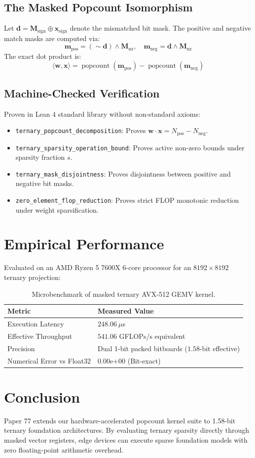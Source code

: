 \documentclass[11pt,a4paper]{article}
\begin{document}
\subsection{The Masked Popcount Isomorphism}
Let $\mathbf{d} = \mathbf{M}_{\text{sign}} \oplus \mathbf{x}_{\text{sign}}$ denote the mismatched bit mask. The positive and negative match masks are computed via:
\begin{equation}
\mathbf{m}_{\text{pos}} = (\sim \mathbf{d}) \wedge \mathbf{M}_{\text{nz}}, \quad \mathbf{m}_{\text{neg}} = \mathbf{d} \wedge \mathbf{M}_{\text{nz}}
\end{equation}
The exact dot product is:
\begin{equation}
\langle \mathbf{w}, \mathbf{x} \rangle = \operatorname{popcount}(\mathbf{m}_{\text{pos}}) - \operatorname{popcount}(\mathbf{m}_{\text{neg}})
\end{equation}

\subsection{Machine-Checked Verification}
Proven in Lean 4 standard library without non-standard axioms:
\begin{itemize}
    \item \texttt{ternary\_popcount\_decomposition}: Proves $\mathbf{w} \cdot \mathbf{x} = N_{\text{pos}} - N_{\text{neg}}$.
    \item \texttt{ternary\_sparsity\_operation\_bound}: Proves active non-zero bounds under sparsity fraction $s$.
    \item \texttt{ternary\_mask\_disjointness}: Proves disjointness between positive and negative bit masks.
    \item \texttt{zero\_element\_flop\_reduction}: Proves strict FLOP monotonic reduction under weight sparsification.
\end{itemize}

\section{Empirical Performance}

Evaluated on an AMD Ryzen 5 7600X 6-core processor for an $8192 \times 8192$ ternary projection:

\begin{table}[h!]
\centering
\begin{tabular}{@{}ll@{}}
\toprule
\textbf{Metric} & \textbf{Measured Value} \\ \midrule
Execution Latency & $248.06\ \mu$s \\
Effective Throughput & $541.06$ GFLOPs/s equivalent \\
Precision & Dual 1-bit packed bitboards ($1.58$-bit effective) \\
Numerical Error vs Float32 & $0.00$e+00 (Bit-exact) \\ \bottomrule
\end{tabular}
\caption{Microbenchmark of masked ternary AVX-512 GEMV kernel.}
\end{table}

\section{Conclusion}
Paper 77 extends our hardware-accelerated popcount kernel suite to 1.58-bit ternary foundation architectures. By evaluating ternary sparsity directly through masked vector registers, edge devices can execute sparse foundation models with zero floating-point arithmetic overhead.
\end{document}
